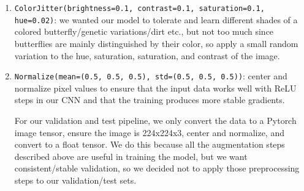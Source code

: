\documentclass[10pt]{article} %
\begin{document}
\begin{enumerate}
  \item\texttt{ColorJitter(brightness=0.1, contrast=0.1, saturation=0.1, hue=0.02)}: we wanted our model to tolerate and learn different shades of a colored butterfly/genetic variations/dirt etc., but not too much since butterflies are mainly distinguished by their color, so apply a small random variation to the hue, saturation, saturation, and contrast of the image.
  \item  \texttt{Normalize(mean=(0.5, 0.5, 0.5), std=(0.5, 0.5, 0.5))}: center and normalize pixel values to ensure that the input data works well with ReLU steps in our CNN and that the training produces more stable gradients.

    For our validation and test pipeline, we only convert the data to a Pytorch image tensor, ensure the image is 224x224x3, center and normalize, and convert to a float tensor. We do this because all the augmentation steps described above are useful in training the model, but we want consistent/stable validation, so we decided not to apply those preprocessing steps to our validation/test sets.
\end{enumerate}
\end{document}

